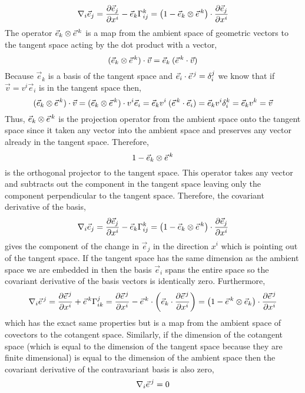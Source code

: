 \documentclass[11pt, a4paper]{article}
\begin{document}
\[ \nabla_i \vec{e}_j = \frac{\partial{\vec{e}_j}}{\partial{x^i}} - \vec{e}_k \Gamma^k_{ij} = \left( 1 - \vec{e}_k \otimes \vec{e}^{\, k} \right) \cdot \frac{\partial{\vec{e}_j}}{\partial{x^i}} \]
The operator  $\vec{e}_k \otimes \vec{e}^{\, k}$ is a map from the ambient space of geometric vectors to the tangent space acting by the dot product with a vector,
\[ (\vec{e}_k \otimes \vec{e}^{\, k}) \cdot \vec{v} = \vec{e}_k \: (\vec{e}^{\, k} \cdot \vec{v}) \]
Because $\vec{e}_k$ is a basis of the tangent space and $\vec{e}_i \cdot \vec{e}^{\, j} = \delta_i^j$ we know that if $\vec{v} = v^i \vec{e}_i$ is in the tangent space then,
\[ (\vec{e}_k \otimes \vec{e}^{\, k}) \cdot \vec{v} = (\vec{e}_k \otimes \vec{e}^{\, k}) \cdot v^i \vec{e}_i = \vec{e}_k v^i \: (\vec{e}^{\, k} \cdot \vec{e}_i) = \vec{e}_k v^i \delta^k_i = \vec{e}_k v^k = \vec{v}  \]
Thus, $\vec{e}_k \otimes \vec{e}^{\, k}$ is the projection operator from the ambient space onto the tangent space since it taken any vector into the ambient space and preserves any vector already in the tangent space. Therefore, 
\[ 1 - \vec{e}_k \otimes \vec{e}^{\, k} \]
is the orthogonal projector to the tangent space. This operator takes any vector and subtracts out the component in the tangent space leaving only the component perpendicular to the tangent space. Therefore, the covariant derivative of the basis,
\[ \nabla_i \vec{e}_j = \frac{\partial{\vec{e}_j}}{\partial{x^i}} - \vec{e}_k \Gamma^k_{ij} = \left( 1 - \vec{e}_k \otimes \vec{e}^{\, k} \right) \cdot \frac{\partial{\vec{e}_j}}{\partial{x^i}} \]
gives the component of the change in $\vec{e}_j$ in the direction $x^i$ which is pointing out of the tangent space. If the tangent space has the same dimension as the ambient space we are embedded in then the basis $\vec{e}_i$ spans the entire space so the covariant derivative of the basis vectors is identically zero. Furthermore, 
\[ \nabla_i \vec{e}^{\, j} = \frac{\partial{\vec{e}^{\, j}}}{\partial{x^i}} + \vec{e}^{\, k} \Gamma^j_{ik} = \frac{\partial{\vec{e}^{\, j}}}{\partial{x^i}} - \vec{e}^{\, k}  \cdot \left( \vec{e}_k \cdot \frac{\partial{\vec{e}^{\, j}}}{\partial{x^i}} \right) = \left(1 - \vec{e}^{\, k} \otimes \vec{e}_k \right) \cdot \frac{\partial{\vec{e}^{\, j}}}{\partial{x^i}} \]
which has the exact same properties but is a map from the ambient space of covectors to the cotangent space. Similarly, if the dimension of the cotangent space (which is equal to the dimension of the tangent space because they are finite dimensional) is equal to the dimension of the ambient space then the covariant derivative of the contravariant basis is also zero,
\[ \nabla_i \vec{e}^{\, j} = 0 \]
\end{document}

